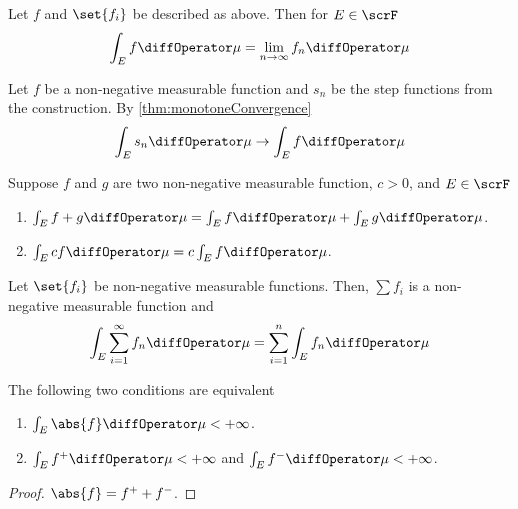 \begin{theorem}\label{thm:monotoneConvergence}
    Let \(f\) and \(\set{f_i}\) be described as above. Then for \(E \in \scrF\)
    \begin{equation*}
        \int_E f \diffOperator \mu = \lim_{n \to \infty} f_n \diffOperator \mu 
    \end{equation*}
\end{theorem}

\begin{remark}
    Let \(f\) be a non-negative measurable function and \(s_n\) be the step functions from the construction. By \ref{thm:monotoneConvergence} 
    \begin{equation*}
        \int_E s_n \diffOperator \mu \to \int_E f \diffOperator \mu 
    \end{equation*}
\end{remark}

\begin{theorem}
    Suppose \(f\) and \(g\) are two non-negative measurable function, \(c > 0\), and \(E \in \scrF\) 
    \begin{enumerate}
        \item \(\int_E f+ g \diffOperator \mu = \int_E f \diffOperator \mu + \int_E g \diffOperator \mu\).
        \item \(\int_E cf \diffOperator \mu = c \int_E f \diffOperator \mu\).
    \end{enumerate}
\end{theorem}

\begin{corollary}
    Let \(\set{f_i}\) be non-negative measurable functions. Then, \(\sum f_i\) is a non-negative measurable function and 
    \begin{equation*}
        \int_E \sum_{i = 1}^{\infty} f_n \diffOperator\mu = \sum_{i = 1}^n \int_E f_n \diffOperator \mu 
    \end{equation*}
\end{corollary}

\begin{lemma}
    The following two conditions are equivalent 
    \begin{enumerate}
        \item \(\int_E \abs{f} \diffOperator \mu < +\infty\).
        \item \(\int_E f^+ \diffOperator \mu < +\infty \) and \(\int_E f^- \diffOperator \mu < + \infty\).
    \end{enumerate}
\end{lemma}
\begin{proof}
    \(\abs{f} = f^+ + f^-\).
\end{proof}

